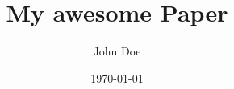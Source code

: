 
    \author{John Doe} %
    \def\authormail{a@b} %
    \def\matrikelnr{asfasdf} %
    \def\authoraddress{adfasdf} %

    \def\city{adfasdf}
    \def\university{adsfsdafd}
    \def\faculty{afdsf}
    \def\department{afds}
    \def\handindate{asfds}

    \def\tutor{afd}
    \def\coursetype{asdf}
    \def\coursetitle{asdfas}
    \def\coursenumber{asdf}

    \title{My awesome Paper} %
    \date{\today}
    \def\papertype{asdfsda} %
    \def\keywords{keyword1 keyword1 keyword2}

    \def\mainlanguage{UKenglish}
    \def\metalanguage{ngerman}
    \usepackage[\metalanguage, \mainlanguage]{babel}
%
%
\usepackage[babel]{csquotes}

\usepackage[style=mla,
            guessmedium=false,
            mancitepar=true,
            backend=biber]{biblatex}

%
%

